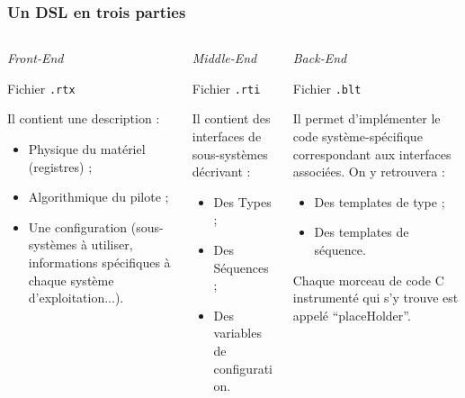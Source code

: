 \documentclass[]{beamer}
\begin{document}
\begin{frame}
\frametitle{Un DSL en trois parties}
\begin{columns}[c]
    
    \begin{column}[l,T]{115pt}
        \begin{center} \large{\itshape{Front-End}} \end{center}
        \scriptsize{
            \begin{center} Fichier \texttt{.rtx} \end{center}
            Il contient une description :
            \begin{itemize}
                \item Physique du matériel (registres) ;
                \item Algorithmique du pilote ;
                \item Une configuration (sous-systèmes à utiliser, informations
                                         spécifiques à chaque système
                                         d'exploitation...).
            \end{itemize}
        }
    \end{column}
    
    \begin{column}[c,T]{115pt}
        \begin{center} \large{\itshape{Middle-End}} \end{center}
        \scriptsize{
            \begin{center} Fichier \texttt{.rti} \end{center}
            Il contient des interfaces de sous-systèmes décrivant :
            \begin{itemize}
                \item Des Types ;
                \item Des Séquences ;
                \item Des variables de configuration.
            \end{itemize}
        }
    \end{column}
    
    \begin{column}[r,T]{115pt}
        \begin{center} \large{\itshape{Back-End}} \end{center}
        \scriptsize{
            \begin{center} Fichier \texttt{.blt} \end{center}
            Il permet d'implémenter le code système-spécifique correspondant
            aux interfaces associées. On y retrouvera :
            \begin{itemize}
                \item Des templates de type ;
                \item Des templates de séquence.
            \end{itemize}
            Chaque morceau de code C instrumenté qui s'y trouve est appelé
            ``placeHolder''.
        }
    \end{column}


\end{columns}
\end{frame}
\end{document}
